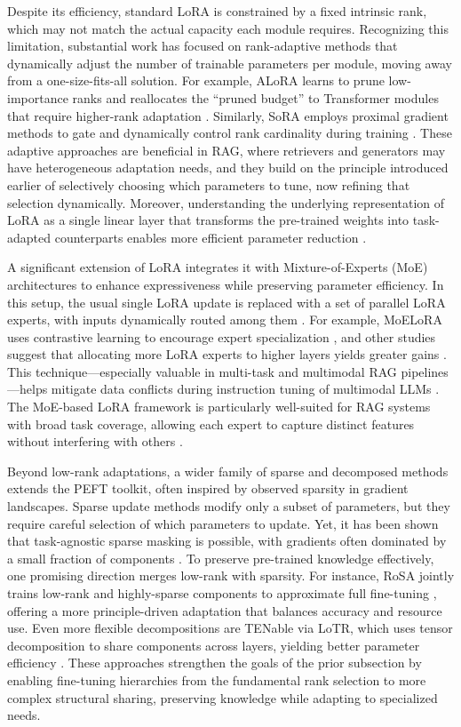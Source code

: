 \documentclass[11pt]{article}
\begin{document}
Despite its efficiency, standard LoRA is constrained by a fixed intrinsic rank, which may not match the actual capacity each module requires. Recognizing this limitation, substantial work has focused on rank-adaptive methods that dynamically adjust the number of trainable parameters per module, moving away from a one-size-fits-all solution. For example, ALoRA learns to prune low-importance ranks and reallocates the ``pruned budget'' to Transformer modules that require higher-rank adaptation \cite{ref211}. Similarly, SoRA employs proximal gradient methods to gate and dynamically control rank cardinality during training \cite{ref212}. These adaptive approaches are beneficial in RAG, where retrievers and generators may have heterogeneous adaptation needs, and they build on the principle introduced earlier of selectively choosing which parameters to tune, now refining that selection dynamically. Moreover, understanding the underlying representation of LoRA as a single linear layer that transforms the pre-trained weights into task-adapted counterparts enables more efficient parameter reduction \cite{ref213}.

A significant extension of LoRA integrates it with Mixture-of-Experts (MoE) architectures to enhance expressiveness while preserving parameter efficiency. In this setup, the usual single LoRA update is replaced with a set of parallel LoRA experts, with inputs dynamically routed among them \cite{ref214}. For example, MoELoRA uses contrastive learning to encourage expert specialization \cite{ref215}, and other studies suggest that allocating more LoRA experts to higher layers yields greater gains \cite{ref216}. This technique---especially valuable in multi-task and multimodal RAG pipelines---helps mitigate data conflicts during instruction tuning of multimodal LLMs \cite{ref217}. The MoE-based LoRA framework is particularly well-suited for RAG systems with broad task coverage, allowing each expert to capture distinct features without interfering with others \cite{ref215}.

Beyond low-rank adaptations, a wider family of sparse and decomposed methods extends the PEFT toolkit, often inspired by observed sparsity in gradient landscapes. Sparse update methods modify only a subset of parameters, but they require careful selection of which parameters to update. Yet, it has been shown that task-agnostic sparse masking is possible, with gradients often dominated by a small fraction of components \cite{ref218}. To preserve pre-trained knowledge effectively, one promising direction merges low-rank with sparsity. For instance, RoSA jointly trains low-rank and highly-sparse components to approximate full fine-tuning \cite{ref219}, offering a more principle-driven adaptation that balances accuracy and resource use. Even more flexible decompositions are TENable via LoTR, which uses tensor decomposition to share components across layers, yielding better parameter efficiency \cite{ref220}. These approaches strengthen the goals of the prior subsection by enabling fine-tuning hierarchies from the fundamental rank selection to more complex structural sharing, preserving knowledge while adapting to specialized needs.
\end{document}
